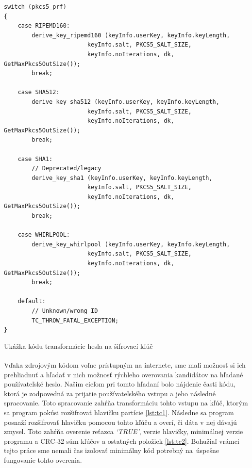\begin{listing}
\begin{verbatim}
switch (pkcs5_prf)
{
	case RIPEMD160:
		derive_key_ripemd160 (keyInfo.userKey, keyInfo.keyLength,
						keyInfo.salt, PKCS5_SALT_SIZE,
						keyInfo.noIterations, dk, GetMaxPkcs5OutSize());
		break;

	case SHA512:
		derive_key_sha512 (keyInfo.userKey, keyInfo.keyLength, 
						keyInfo.salt, PKCS5_SALT_SIZE, 
						keyInfo.noIterations, dk, GetMaxPkcs5OutSize());
		break;

	case SHA1:
		// Deprecated/legacy
		derive_key_sha1 (keyInfo.userKey, keyInfo.keyLength,
						keyInfo.salt, PKCS5_SALT_SIZE, 
						keyInfo.noIterations, dk, GetMaxPkcs5OutSize());
		break;

	case WHIRLPOOL:
		derive_key_whirlpool (keyInfo.userKey, keyInfo.keyLength, 
						keyInfo.salt, PKCS5_SALT_SIZE, 
						keyInfo.noIterations, dk, GetMaxPkcs5OutSize());
		break;

	default:		
		// Unknown/wrong ID
		TC_THROW_FATAL_EXCEPTION;
}
\end{verbatim}
\caption{Ukážka kódu transformácie hesla na šifrovací kľúč}
\label{lst:tc1}
\end{listing}

\paragraph{}
Vďaka zdrojovým kódom voľne prístupným na internete, sme mali možnosť si ich prehliadnuť a hľadať v nich možnosť rýchleho overovania kandidátov na hľadané používateľské heslo. Našim cieľom pri tomto hľadaní bolo nájdenie časti kódu, ktorá je zodpovedná za prijatie používateľského vstupu a jeho následné spracovanie. Toto spracovanie zahŕňa transformáciu tohto vstupu na kľúč, ktorým sa program pokúsi rozšifrovať hlavičku partície \ref{lst:tc1}. Následne sa program posnaží rozšifrovať hlavičku pomocou tohto kľúču a overí, či dáta v nej dávajú zmysel. Toto zahŕňa overenie reťazca \emph{`TRUE'}, verzie hlavičky, minimálnej verzie programu a CRC-32 súm kľúčov a ostatných položiek \ref{lst:tc2}. Bohužiaľ vrámci tejto práce sme nemali čas izolovať minimálny kód potrebný na~úspešne fungovanie tohto overenia.

